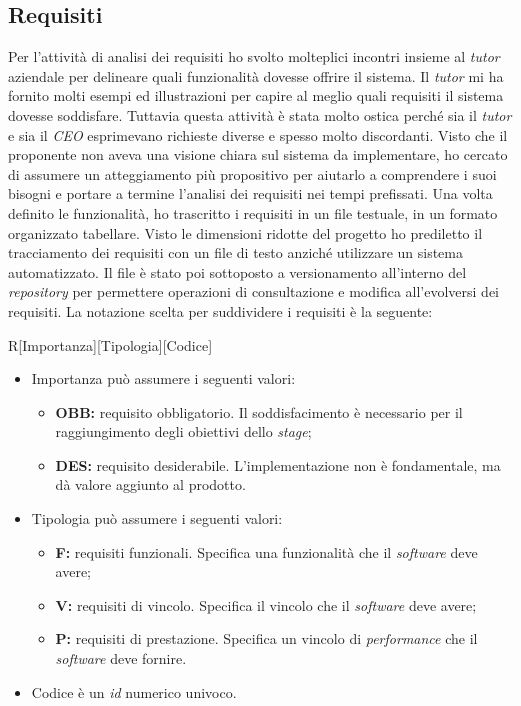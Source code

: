 \subsection{Requisiti}
Per l'attività di analisi dei requisiti ho svolto molteplici incontri insieme al \emph{tutor} aziendale per delineare quali funzionalità dovesse offrire il sistema. Il \emph{tutor} mi ha fornito molti esempi ed illustrazioni per capire al meglio quali requisiti il sistema dovesse soddisfare. Tuttavia questa attività è stata molto ostica perché sia il \emph{tutor} e sia il \emph{CEO} esprimevano richieste diverse e spesso molto discordanti. Visto che il proponente non aveva una visione chiara sul sistema da implementare, ho cercato di assumere un atteggiamento più propositivo per aiutarlo a comprendere i suoi bisogni e portare a termine l'analisi dei requisiti nei tempi prefissati. Una volta definito le funzionalità, ho trascritto i requisiti in un file testuale, in un formato organizzato tabellare. Visto le dimensioni ridotte del progetto ho prediletto il tracciamento dei requisiti con un file di testo anziché utilizzare un sistema automatizzato. Il file è stato poi sottoposto a versionamento all'interno del \emph{repository} per permettere operazioni di consultazione e modifica all'evolversi dei requisiti. La notazione scelta per suddividere i requisiti è la seguente: 
\begin{center}
R[Importanza][Tipologia][Codice]
\end{center}
\newpage
\begin{itemize}
\item Importanza può assumere i seguenti valori:
\begin{itemize}
\item \textbf{OBB:} requisito obbligatorio. Il soddisfacimento è necessario per il raggiungimento degli obiettivi dello \emph{stage};
\item \textbf{DES:} requisito desiderabile. L'implementazione non è fondamentale, ma dà valore aggiunto al prodotto.
\end{itemize}
\item Tipologia può assumere i seguenti valori:
\begin{itemize}
\item \textbf{F:} requisiti funzionali. Specifica una funzionalità che il \emph{software} deve avere;
\item \textbf{V:} requisiti di vincolo. Specifica il vincolo che il \emph{software} deve avere;
\item \textbf{P:} requisiti di prestazione. Specifica un vincolo di \emph{performance} che il \emph{software} deve fornire.
\end{itemize}
\item Codice è un \emph{id} numerico univoco.
\end{itemize}
